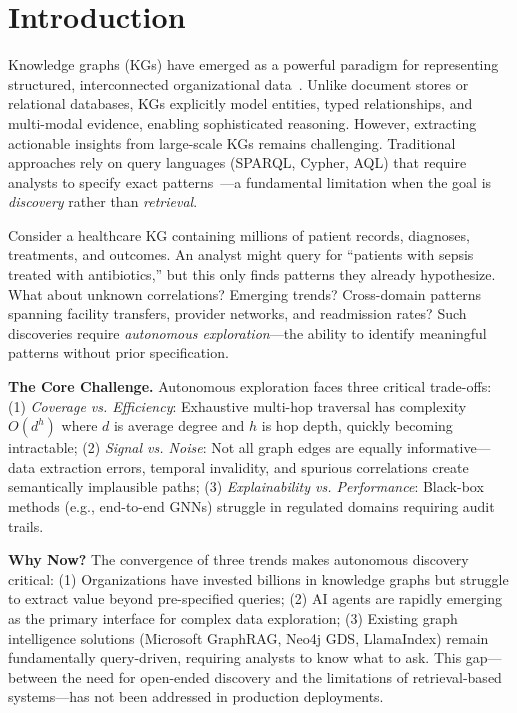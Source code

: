 \documentclass[10pt,twocolumn]{article}
\begin{document}
\section{Introduction}

Knowledge graphs (KGs) have emerged as a powerful paradigm for representing structured, interconnected organizational data~\cite{paulheim2017knowledge}. Unlike document stores or relational databases, KGs explicitly model entities, typed relationships, and multi-modal evidence, enabling sophisticated reasoning. However, extracting actionable insights from large-scale KGs remains challenging. Traditional approaches rely on query languages (SPARQL, Cypher, AQL) that require analysts to specify exact patterns~\cite{angles2017foundations}---a fundamental limitation when the goal is \textit{discovery} rather than \textit{retrieval}.

Consider a healthcare KG containing millions of patient records, diagnoses, treatments, and outcomes. An analyst might query for ``patients with sepsis treated with antibiotics,'' but this only finds patterns they already hypothesize. What about unknown correlations? Emerging trends? Cross-domain patterns spanning facility transfers, provider networks, and readmission rates? Such discoveries require \textit{autonomous exploration}---the ability to identify meaningful patterns without prior specification.

\textbf{The Core Challenge.} Autonomous exploration faces three critical trade-offs: (1) \textit{Coverage vs. Efficiency}: Exhaustive multi-hop traversal has complexity $O(d^h)$ where $d$ is average degree and $h$ is hop depth, quickly becoming intractable; (2) \textit{Signal vs. Noise}: Not all graph edges are equally informative---data extraction errors, temporal invalidity, and spurious correlations create semantically implausible paths; (3) \textit{Explainability vs. Performance}: Black-box methods (e.g., end-to-end GNNs) struggle in regulated domains requiring audit trails.

\textbf{Why Now?} The convergence of three trends makes autonomous discovery critical: (1) Organizations have invested billions in knowledge graphs but struggle to extract value beyond pre-specified queries; (2) AI agents are rapidly emerging as the primary interface for complex data exploration; (3) Existing graph intelligence solutions (Microsoft GraphRAG, Neo4j GDS, LlamaIndex) remain fundamentally query-driven, requiring analysts to know what to ask. This gap---between the need for open-ended discovery and the limitations of retrieval-based systems---has not been addressed in production deployments.
\end{document}
